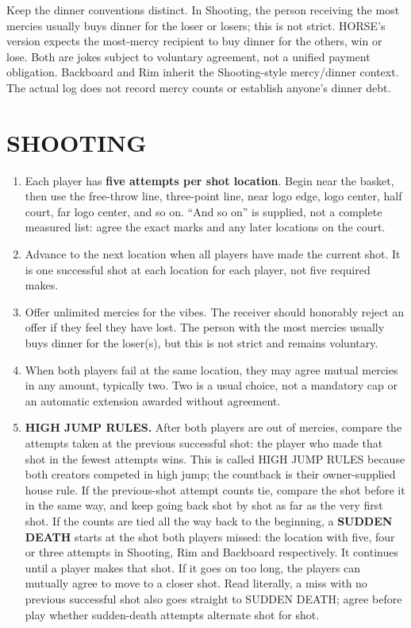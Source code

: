 \documentclass[11pt]{article}
\begin{document}
Keep the dinner conventions distinct. In Shooting, the person receiving the
most mercies usually buys dinner for the loser or losers; this is not strict.
HORSE's version expects the most-mercy recipient to buy dinner for the others,
win or lose. Both are jokes subject to voluntary agreement, not a unified payment
obligation. Backboard and Rim inherit the Shooting-style mercy/dinner context.
The actual log does not record mercy counts or establish anyone's dinner debt.

\clearpage
\section{SHOOTING}
\begin{enumerate}[start=1]
\item Each player has \textbf{five attempts per shot location}. Begin near the
basket, then use the free-throw line, three-point line, near logo edge, logo
center, half court, far logo center, and so on. ``And so on'' is supplied, not a
complete measured list: agree the exact marks and any later locations on the court.
\item Advance to the next location when all players have made the current shot.
It is one successful shot at each location for each player, not five required makes.
\item Offer unlimited mercies for the vibes. The receiver should honorably
reject an offer if they feel they have lost. The person with the most mercies
usually buys dinner for the loser(s), but this is not strict and remains voluntary.
\item When both players fail at the same location, they may agree mutual
mercies in any amount, typically two. Two is a usual choice, not a mandatory cap
or an automatic extension awarded without agreement.
\item \textbf{HIGH JUMP RULES.} After both players are out of mercies, compare
the attempts taken at the previous successful shot: the player who made that
shot in the fewest attempts wins. This is called HIGH JUMP RULES because both
creators competed in high jump; the countback is their owner-supplied house rule.
If the previous-shot attempt counts tie, compare the shot before it in the same
way, and keep going back shot by shot as far as the very first shot. If the
counts are tied all the way back to the beginning, a \textbf{SUDDEN DEATH} starts
at the shot both players missed: the location with five, four or three attempts
in Shooting, Rim and Backboard respectively. It continues until a player makes
that shot. If it goes on too long, the players can mutually agree to move to a
closer shot. Read literally, a miss with no previous successful shot also goes
straight to SUDDEN DEATH; agree before play whether sudden-death attempts
alternate shot for shot.
\end{enumerate}
\end{document}
